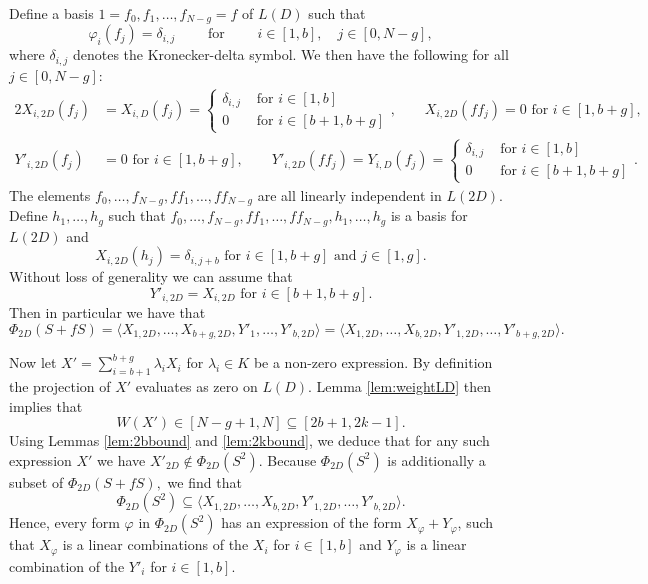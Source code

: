 \documentclass[12pt]{amsart}
\theoremstyle{definition}
\begin{document}
	Define a basis $1 = f_0, f_1, \ldots, f_{N-g} = f$ of $L(D)$ such that 
	$$\varphi_i(f_j) = \delta_{i, j} \qquad \text{ for } \qquad i\in [1, b], \quad j \in [0, N-g],$$
	where $\delta_{i, j}$ denotes the Kronecker-delta symbol. 
	We then have the following for all $j \in [0, N-g]$: 
	\begin{alignat*}{2}
		X_{i,2D}(f_j) &= X_{i, D}(f_j) = \begin{cases} \delta_{i,j} &\text{ for } i \in [1, b] \\ 0 &\text{ for } i \in [b+1, b+g] \end{cases},
		\qquad X_{i,2D}(f f_j) = 0 \text{ for } i \in [1, b+g],
		\\
		Y'_{i,2D}(f_j) &= 0 \text{ for } i \in [1, b+g],
		\qquad Y'_{i,2D}(ff_j) = Y_{i, D}(f_j) = \begin{cases} \delta_{i,j} &\text{ for } i \in [1, b] \\ 0 &\text{ for } i \in [b+1, b+g] \end{cases}.
	\end{alignat*}
	The elements $f_0, \ldots, f_{N-g}, ff_1, \ldots, ff_{N-g}$ are all linearly independent in $L(2D)$. Define $h_1, \ldots, h_g$ such that $f_0, \ldots, f_{N-g}, ff_1, \ldots, ff_{N-g}, h_1, \ldots, h_g$ is a basis for $L(2D)$ and 
	$$X_{i, 2D}(h_j) = \delta_{i, j+b} \text{ for } i\in [1, b+g] \text{ and } j \in [1, g].$$ 
	Without loss of generality we can assume that
	$$Y'_{i, 2D} = X_{i, 2D} \text{ for } i \in [b+1, b+g].$$
	Then in particular we have that 
	$$\Phi_{2D}(S + fS) = \langle X_{1,2D}, \ldots, X_{b+g,2D}, Y'_1, \ldots, Y'_{b,2D} \rangle = \langle X_{1,2D}, \ldots, X_{b,2D}, Y'_{1,2D}, \ldots, Y'_{b+g,2D} \rangle.$$ 
	
	Now let $X' = \sum_{i=b+1}^{b+g} \lambda_{i} X_{i}$ for $\lambda_i \in K$ be a non-zero expression. By definition the projection of $X'$ evaluates as zero on $L(D)$. Lemma \ref{lem:weightLD} then implies that
	$$W(X') \in [N-g + 1, N] \subseteq [2b+1, 2k-1].$$ 
	Using Lemmas \ref{lem:2bbound} and \ref{lem:2kbound}, we deduce that for any such expression $X'$ we have $X'_{2D} \not\in \Phi_{2D}(S^2)$. Because $\Phi_{2D}(S^2)$ is additionally a subset of $\Phi_{2D}(S+fS),$ we find that 
	\begin{equation}\label{eq:anhS2}
		\Phi_{2D}(S^2) \subseteq   \langle X_{1,2D}, \ldots, X_{b,2D}, Y'_{1,2D}, \ldots, Y'_{b,2D} \rangle.
	\end{equation}
	Hence, every form $\varphi$ in $\Phi_{2D}(S^2)$ has an expression of the form $X_\varphi + Y_\varphi$, such that $X_\varphi$ is a linear combinations of the $X_i$ for $i \in [1, b]$ and $Y_\varphi$ is a linear combination of the $Y'_i$ for $i \in [1, b]$. 
	
\end{document}
